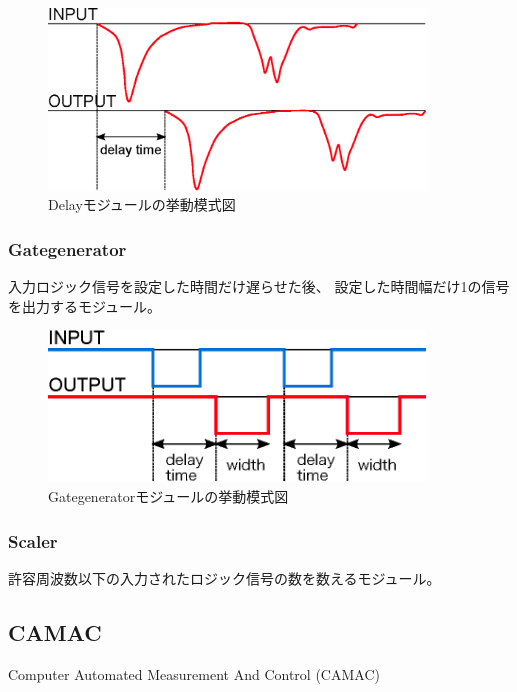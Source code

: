 \documentclass{jarticle}
\begin{document}
	  \begin{figure}[H]
	   \begin{center}
	    \includegraphics[width = 100mm]{./picture/Delay.eps}
	   \end{center}
	   \caption{Delayモジュールの挙動模式図}
	   \label{Fig:Delay}
	  \end{figure}
	  
	  
   \subsubsection*{Gategenerator}
   	  
	  入力ロジック信号を設定した時間だけ遅らせた後、
	  設定した時間幅だけ1の信号を出力するモジュール。
	  
	  \begin{figure}[H]
	   \begin{center}
	    \includegraphics[width = 100mm]{./picture/Gategenerator.eps}
	   \end{center}
	   \caption{Gategeneratorモジュールの挙動模式図}
	   \label{Fig:Gategenerator}
	  \end{figure}
	  
	  
   \subsubsection*{Scaler}
	  
	  許容周波数以下の入力されたロジック信号の数を数えるモジュール。
	  
	  
	  
	  

  \subsection{CAMAC}
  Computer Automated Measurement And Control (CAMAC)
\end{document}
